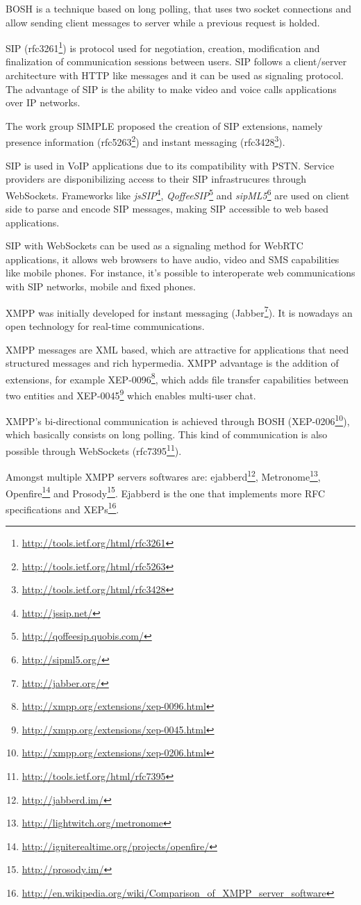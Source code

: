   \ac{BOSH} is a technique based on long polling, that uses two socket connections and allow sending client messages to server while a previous request is holded.

  \ac{SIP} (rfc3261\footnote{\url{http://tools.ietf.org/html/rfc3261}}) is protocol used for negotiation, creation, modification and finalization of communication sessions between users. \ac{SIP} follows a client/server architecture with \ac{HTTP} like messages and it can be used as signaling protocol. The advantage of \ac{SIP} is the ability to make video and voice calls applications over \ac{IP} networks.

  The work group \ac{SIMPLE} proposed the creation of \ac{SIP} extensions, namely presence information (rfc5263\footnote{\url{http://tools.ietf.org/html/rfc5263}}) and instant messaging (rfc3428\footnote{\url{http://tools.ietf.org/html/rfc3428}}).

  \ac{SIP} is used in \ac{VoIP} applications due to its compatibility with \ac{PSTN}. Service providers are disponibilizing access to their \ac{SIP} infrastrucures through WebSockets. Frameworks like \textit{jsSIP}\footnote{\url{http://jssip.net/}}, \textit{QoffeeSIP}\footnote{\url{http://qoffeesip.quobis.com/}} and \textit{sipML5}\footnote{\url{http://sipml5.org/}} are used on client side to parse and encode \ac{SIP} messages, making \ac{SIP} accessible to web based applications. 

  \ac{SIP} with WebSockets can be used as a signaling method for WebRTC applications, it allows web browsers to have audio, video and \ac{SMS} capabilities like mobile phones. For instance, it's possible to interoperate web communications with \ac{SIP} networks, mobile and fixed phones.

  \ac{XMPP} was initially developed for instant messaging (Jabber\footnote{\url{http://jabber.org/}}). It is nowadays an open technology for real-time communications. 

  \ac{XMPP} messages are \ac{XML} based, which are attractive for applications that need structured messages and rich hypermedia. \ac{XMPP} advantage is the addition of extensions, for example XEP-0096\footnote{\url{http://xmpp.org/extensions/xep-0096.html}}, which adds file transfer capabilities between two entities and XEP-0045\footnote{\url{http://xmpp.org/extensions/xep-0045.html}} which enables multi-user chat.

  \ac{XMPP}'s bi-directional communication is achieved through \ac{BOSH} (XEP-0206\footnote{\url{http://xmpp.org/extensions/xep-0206.html}}), which basically consists on long polling. This kind of communication is also possible through WebSockets (rfc7395\footnote{\url{http://tools.ietf.org/html/rfc7395}}).

  Amongst multiple XMPP servers softwares are: ejabberd\footnote{\url{http://jabberd.im/}}, Metronome\footnote{\url{http://lightwitch.org/metronome}}, Openfire\footnote{\url{http://igniterealtime.org/projects/openfire/}} and Prosody\footnote{\url{http://prosody.im/}}. Ejabberd is the one that implements more \ac{RFC} specifications and \ac{XEP}s\footnote{\url{http://en.wikipedia.org/wiki/Comparison_of_XMPP_server_software}}.

